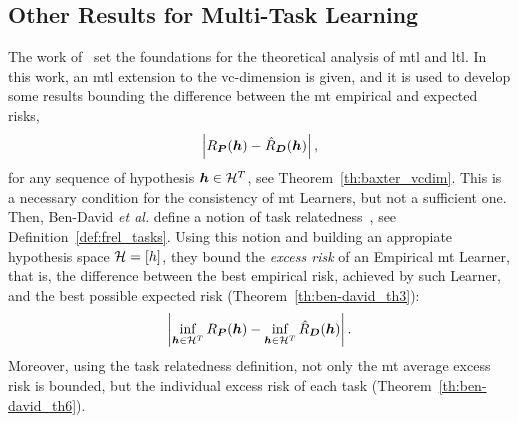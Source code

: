 \subsection{Other Results for Multi-Task Learning}
The work of~\cite{baxter2000model} set the foundations for the theoretical analysis of \acrshort{mtl} and \acrshort{ltl}. 
In this work, an \acrshort{mtl} extension to the \acrshort{vc}-dimension is given, and it is used to develop some results bounding the difference between the \acrshort{mt} empirical and expected risks,
\begin{equation}
    \nonumber
    \left|R_{\bm{P}}(\bm{h}) - \hat{R}_{\bm{D}}(\bm{h})\right| ,
\end{equation}
for any sequence of hypothesis $\bm{h} \in \mathcal{H}^T$, see Theorem~\ref{th:baxter_vcdim}. This is a necessary condition for the consistency of \acrshort{mt} Learners, but not a sufficient one.
Then, Ben-David \emph{et al.} define a notion of task relatedness~\citep{Ben-DavidS03,Ben-DavidB08}, see Definition~\ref{def:frel_tasks}. Using this notion and building an appropiate hypothesis space $\mathcal{H} = \lbrack h\rbrack$, they bound the \emph{excess risk} of an Empirical \acrshort{mt} Learner, that is, the difference between the best empirical risk, achieved by such Learner, and the best possible expected risk (Theorem~\ref{th:ben-david_th3}):
\begin{equation}
    \nonumber
    \left|\inf_{\bm{h} \in \mathcal{H}^T} R_{\bm{P}}(\bm{h}) - \inf_{\bm{h} \in \mathcal{H}^T} \hat{R}_{\bm{D}}(\bm{h})\right| .
\end{equation}
Moreover, using the task relatedness definition, not only the \acrshort{mt} average excess risk is bounded, but the individual excess risk of each task (Theorem~\ref{th:ben-david_th6}).

